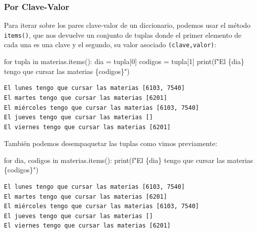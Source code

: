 \documentclass[
  letterpaper,
  DIV=11,
  numbers=noendperiod]{scrreprt}
\newenvironment{Shaded}{\begin{snugshade}}{\end{snugshade}}
\newcommand{\BuiltInTok}[1]{\textcolor[rgb]{0.00,0.23,0.31}{#1}}
\newcommand{\ControlFlowTok}[1]{\textcolor[rgb]{0.00,0.23,0.31}{#1}}
\newcommand{\DecValTok}[1]{\textcolor[rgb]{0.68,0.00,0.00}{#1}}
\newcommand{\KeywordTok}[1]{\textcolor[rgb]{0.00,0.23,0.31}{#1}}
\newcommand{\NormalTok}[1]{\textcolor[rgb]{0.00,0.23,0.31}{#1}}
\newcommand{\OperatorTok}[1]{\textcolor[rgb]{0.37,0.37,0.37}{#1}}
\newcommand{\SpecialCharTok}[1]{\textcolor[rgb]{0.37,0.37,0.37}{#1}}
\newcommand{\SpecialStringTok}[1]{\textcolor[rgb]{0.13,0.47,0.30}{#1}}
\begin{document}
\subsubsection{Por Clave-Valor}\label{por-clave-valor}

Para iterar sobre los pares clave-valor de un diccionario, podemos usar
el método \texttt{items()}, que nos devuelve un conjunto de tuplas donde
el primer elemento de cada una es una clave y el segundo, su valor
asociado \texttt{(clave,valor)}:

\begin{Shaded}
\begin{Highlighting}[]
\ControlFlowTok{for}\NormalTok{ tupla }\KeywordTok{in}\NormalTok{ materias.items():}
\NormalTok{  dia }\OperatorTok{=}\NormalTok{ tupla[}\DecValTok{0}\NormalTok{]}
\NormalTok{  codigos }\OperatorTok{=}\NormalTok{ tupla[}\DecValTok{1}\NormalTok{]}
  \BuiltInTok{print}\NormalTok{(}\SpecialStringTok{f"El }\SpecialCharTok{\{}\NormalTok{dia}\SpecialCharTok{\}}\SpecialStringTok{ tengo que cursar las materias }\SpecialCharTok{\{}\NormalTok{codigos}\SpecialCharTok{\}}\SpecialStringTok{"}\NormalTok{)}
\end{Highlighting}
\end{Shaded}

\begin{verbatim}
El lunes tengo que cursar las materias [6103, 7540]
El martes tengo que cursar las materias [6201]
El miércoles tengo que cursar las materias [6103, 7540]
El jueves tengo que cursar las materias []
El viernes tengo que cursar las materias [6201]
\end{verbatim}

También podemos desempaquetar las tuplas como vimos previamente:

\begin{Shaded}
\begin{Highlighting}[]
\ControlFlowTok{for}\NormalTok{ dia, codigos }\KeywordTok{in}\NormalTok{ materias.items():}
  \BuiltInTok{print}\NormalTok{(}\SpecialStringTok{f"El }\SpecialCharTok{\{}\NormalTok{dia}\SpecialCharTok{\}}\SpecialStringTok{ tengo que cursar las materias }\SpecialCharTok{\{}\NormalTok{codigos}\SpecialCharTok{\}}\SpecialStringTok{"}\NormalTok{)}
\end{Highlighting}
\end{Shaded}

\begin{verbatim}
El lunes tengo que cursar las materias [6103, 7540]
El martes tengo que cursar las materias [6201]
El miércoles tengo que cursar las materias [6103, 7540]
El jueves tengo que cursar las materias []
El viernes tengo que cursar las materias [6201]
\end{verbatim}
\end{document}
